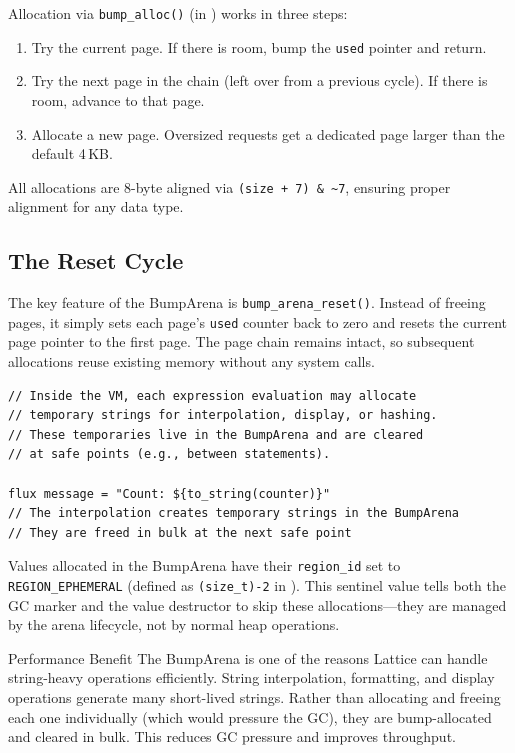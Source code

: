 Allocation via \lstinline|bump_alloc()| (in ) works in three steps:

\begin{enumerate}
  \item Try the current page. If there is room, bump the \lstinline|used| pointer and return.
  \item Try the next page in the chain (left over from a previous cycle). If there is room, advance to that page.
  \item Allocate a new page. Oversized requests get a dedicated page larger than the default 4\,KB.
\end{enumerate}

All allocations are 8-byte aligned via \lstinline|(size + 7) & ~7|, ensuring proper alignment for any data type.

\subsection{The Reset Cycle}

The key feature of the BumpArena is \lstinline|bump_arena_reset()|.
Instead of freeing pages, it simply sets each page's \lstinline|used| counter back to zero and resets the current page pointer to the first page.
The page chain remains intact, so subsequent allocations reuse existing memory without any system calls.

\begin{lstlisting}[language=Lattice, caption={Ephemeral allocations for temporaries}]
// Inside the VM, each expression evaluation may allocate
// temporary strings for interpolation, display, or hashing.
// These temporaries live in the BumpArena and are cleared
// at safe points (e.g., between statements).

flux message = "Count: ${to_string(counter)}"
// The interpolation creates temporary strings in the BumpArena
// They are freed in bulk at the next safe point
\end{lstlisting}

Values allocated in the BumpArena have their \lstinline|region_id| set to \lstinline|REGION_EPHEMERAL| (defined as \lstinline|(size_t)-2| in ).
This sentinel value tells both the GC marker and the value destructor to skip these allocations---they are managed by the arena lifecycle, not by normal heap operations.

\begin{tipbox}{Performance Benefit}
The BumpArena is one of the reasons Lattice can handle string-heavy operations efficiently.
String interpolation, formatting, and display operations generate many short-lived strings.
Rather than allocating and freeing each one individually (which would pressure the GC), they are bump-allocated and cleared in bulk.
This reduces GC pressure and improves throughput.
\end{tipbox}

